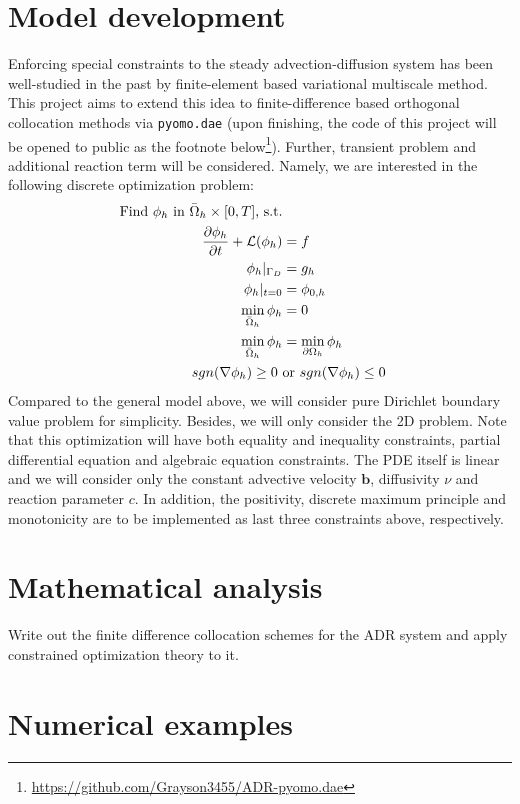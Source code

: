 \documentclass{article}
\begin{document}
\section{Model development}
Enforcing special constraints to the steady advection-diffusion system has been well-studied in the past by finite-element based variational multiscale method\cite{evans2009enforcement}. This project aims to extend this idea to finite-difference based orthogonal collocation methods via \texttt{pyomo.dae} (upon finishing, the code of this project will be opened to public as the footnote below\footnote{\url{https://github.com/Grayson3455/ADR-pyomo.dae}}). Further, transient problem and additional reaction term will be considered. Namely, we are interested in the following discrete optimization problem:
\begin{alignat*}{1}
\text{Find $\phi_h$ in $\Bar{\Omega}_h\times[0 ,T]$, s.t.} \\
    \displaystyle {\frac{\partial \phi_h}{\partial t}}  + \mathcal{L}(\phi_h) &= f \\
    \phi_h|_{\Gamma_D} &= g_h\\
    \phi_h|_{t=0} &= \phi_{0,h}\\
    \min_{\Bar{\Omega}_h} \phi_h &= 0 \\
    \min_{\Bar{\Omega}_h} \phi_h &= \min_{\partial \Omega_h} \phi_h \\
    sgn(\nabla \phi_h) \geq 0 \ &\text{or} \ sgn(\nabla \phi_h) \leq 0
\end{alignat*}
Compared to the general model above, we will consider pure Dirichlet boundary value problem for simplicity. Besides, we will only consider the 2D problem. 
Note that this optimization will have both equality and inequality constraints, partial differential equation and algebraic equation constraints. The PDE itself is linear and we will consider only the constant advective velocity $\mathbf{b}$, diffusivity $\nu$ and reaction parameter $c$. In addition, the positivity, discrete maximum principle and monotonicity are to be implemented as last three constraints above, respectively.
\section{Mathematical analysis}
Write out the finite difference collocation schemes for the ADR system and apply constrained optimization theory to it.
\section{Numerical examples}
\end{document}
